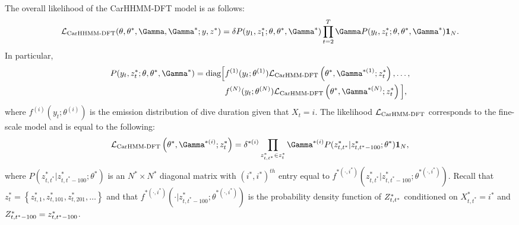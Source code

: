 The overall likelihood of the CarHHMM-DFT model is as follows:
%
$$\calL_{\text{CarHHMM-DFT}}(\theta,\theta^*,\Gamma,\Gamma^*;y,z^*) = \delta P(y_1,z_1^*;\theta,\theta^*,\Gamma^*) \prod_{t=2}^T \Gamma P(y_t,z_t^*;\theta,\theta^*,\Gamma^*) \mathbf{1}_N.$$
%
In particular,
%
\begin{align*}
P(y_t,z_t^*;\theta,\theta^*,\Gamma^*)  = \text{diag}\Big[&f^{(1)}(y_t;\theta^{(1)})\calL_{\text{CarHMM-DFT}}\left(\theta^*,\Gamma^{*(1)};z_t^*\right), \ldots , \\
&f^{(N)}(y_t;\theta^{(N)})\calL_{\text{CarHMM-DFT}}\left(\theta^*,\Gamma^{*(N)};z_t^*\right) \Big],
\end{align*}
%
where $f^{(i)}(y_t;\theta^{(i)})$ is the emission distribution of dive duration given that $X_t = i$. The likelihood $\mathcal{L}_{\text{CarHMM-DFT}}$ corresponds to the fine-scale model and is equal to the following:
%
$$\calL_{\text{CarHMM-DFT}}\left(\theta^{*},\Gamma^{*(i)};z_t^*\right) = \delta^{*(i)} \prod_{z^*_{t,t^*} \in z^*_t} \Gamma^{*(i)} P(z^*_{t,t^*}|z^*_{t,t^*-100};\theta^*) \mathbf{1}_N,$$
%
where $P(z^*_{t,t^*}|z^*_{t,t^*-100};\theta^*)$ is an $N^* \times N^*$ diagonal matrix with $(i^*,i^*)^{th}$ entry equal to $f^{*(\cdot,i^*)}(z^*_{t,t^*}|z^*_{t,t^*-100}; \theta^{*(\cdot,i^*)})$.
%
Recall that $z^*_t = \left\{z^*_{t,1},z^*_{t,101},z^*_{t,201},\ldots\right\}$ and that $f^{*(\cdot,i^*)}(\cdot|z^*_{t,t^*-100}; \theta^{*(\cdot,i^*)})$ is the probability density function of $Z^*_{t,t^*}$ conditioned on $X^*_{t,t^*} = i^*$ and $Z^*_{t,t^*-100} = z^*_{t,t^*-100}$.